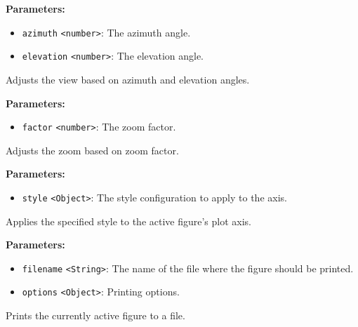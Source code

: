 \documentclass[12pt,a4paper]{article}
\begin{document}
\noindent \textbf{Parameters:}
\begin{itemize}
  \item \texttt{azimuth} \texttt{<number>}: The azimuth angle.
  \item \texttt{elevation} \texttt{<number>}: The elevation angle.
\end{itemize}

\noindent Adjusts the view based on azimuth and elevation angles.

\vspace{5mm}
\noindent {}


\noindent \textbf{Parameters:}
\begin{itemize}
  \item \texttt{factor} \texttt{<number>}: The zoom factor.
\end{itemize}

\noindent Adjusts the zoom based on zoom factor.

\vspace{5mm}
\noindent {}


\noindent \textbf{Parameters:}
\begin{itemize}
  \item \texttt{style} \texttt{<Object>}: The style configuration to apply to the axis.
\end{itemize}

\noindent Applies the specified style to the active figure's plot axis.

\vspace{5mm}
\noindent {}


\noindent \textbf{Parameters:}
\begin{itemize}
  \item \texttt{filename} \texttt{<String>}: The name of the file where the figure should be printed.
  \item \texttt{options} \texttt{<Object>}: Printing options.
\end{itemize}

\noindent Prints the currently active figure to a file.
\end{document}
